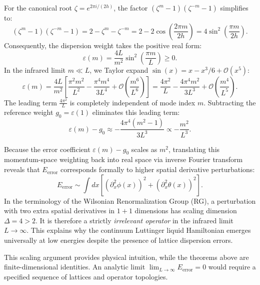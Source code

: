 \begin{remark}
For the canonical root $\zeta = e^{2\pi i / (2h)}$, the factor $(\zeta^m - 1)(\zeta^{-m} - 1)$ simplifies to:
\begin{equation}
(\zeta^m - 1)(\zeta^{-m} - 1) = 2 - \zeta^m - \zeta^{-m} = 2 - 2\cos\left(\frac{2\pi m}{2h}\right) = 4\sin^2\left(\frac{\pi m}{2h}\right).
\end{equation}
Consequently, the dispersion weight takes the positive real form:
\begin{equation}
\varepsilon(m) = \frac{4L}{m^2} \sin^2\left(\frac{\pi m}{L}\right) \ge 0.
\end{equation}
In the infrared limit $m \ll L$, we Taylor expand $\sin(x) = x - x^3/6 + \mathcal{O}(x^5)$:
\begin{equation}
\varepsilon(m) = \frac{4L}{m^2} \left[ \frac{\pi^2 m^2}{L^2} - \frac{\pi^4 m^4}{3 L^4} + \mathcal{O}\left(\frac{m^6}{L^6}\right) \right] = \frac{4\pi^2}{L} - \frac{4\pi^4 m^2}{3 L^3} + \mathcal{O}\left(\frac{m^4}{L^5}\right).
\end{equation}
The leading term $\frac{4\pi^2}{L}$ is completely independent of mode index $m$. Subtracting the reference weight $g_0 = \varepsilon(1)$ eliminates this leading term:
\begin{equation}
\varepsilon(m) - g_0 \approx - \frac{4\pi^4 (m^2 - 1)}{3 L^3} \propto - \frac{m^2}{L^3}.
\end{equation}
\end{remark}

\begin{remark}
Because the error coefficient $\varepsilon(m) - g_0$ scales as $m^2$, translating this momentum-space weighting back into real space via inverse Fourier transform reveals that $E_{\mathrm{error}}$ corresponds formally to higher spatial derivative perturbations:
\begin{equation}
E_{\mathrm{error}} \sim \int dx \left[ (\partial_x^2 \phi(x))^2 + (\partial_x^2 \theta(x))^2 \right].
\end{equation}
In the terminology of the Wilsonian Renormalization Group (RG), a perturbation with two extra spatial derivatives in $1+1$ dimensions has scaling dimension $\Delta = 4 > 2$. It is therefore a strictly \emph{irrelevant operator} in the infrared limit $L \to \infty$. This explains why the continuum Luttinger liquid Hamiltonian emerges universally at low energies despite the presence of lattice dispersion errors.

This scaling argument provides physical intuition, while the theorems above are finite-dimensional identities. An analytic limit $\lim_{L\to\infty}E_{\mathrm{error}}=0$ would require a specified sequence of lattices and operator topologies.
\end{remark}


